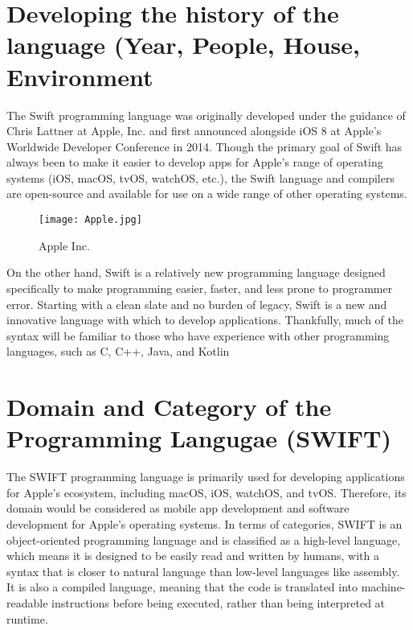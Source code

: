 \documentclass[11pt]{Abdullahmad} %
\begin{document}

\section*{Developing the history of the language (Year, People, House, Environment}

The Swift programming language was originally developed under the  guidance of  Chris Lattner at Apple, Inc. and first announced alongside  iOS 8 at Apple’s  Worldwide Developer Conference in 2014.
Though the primary goal of Swift has always been to make it easier to develop apps for Apple’s range of operating systems (iOS, macOS, tvOS,  watchOS, etc.), the Swift language and compilers  are open-source and available for use on a wide  range of other operating systems.

\begin{wrapfigure}{l}{0.42\textwidth} %
	\texttt{[image: Apple.jpg]}
	\caption{Apple Inc.}
\end{wrapfigure}
On the other hand, Swift is a relatively new programming language  designed specifically to make  programming  easier, faster, and less prone  to programmer error. Starting with a clean slate and no burden of  legacy, 
Swift is a new and innovative language with which to develop  applications. Thankfully, much of the syntax will be familiar to those  who have experience with other programming languages, such as C, C++, Java, and Kotlin


\newpage
\section*{Domain and Category of the Programming Langugae (SWIFT)}

The SWIFT programming language is primarily used for developing applications for Apple's ecosystem,
including macOS, iOS, watchOS, and tvOS. Therefore, its domain would be considered as 
mobile app development and software development for Apple's operating systems.
In terms of categories, SWIFT is an object-oriented programming language and is classified 
as a high-level language, which means it is designed to be easily read and written by humans, 
with a syntax that is closer to natural language than low-level languages like assembly. 
It is also a compiled language, meaning that the code is translated into machine-readable
instructions before being executed, rather than being interpreted at runtime.
\end{document}
